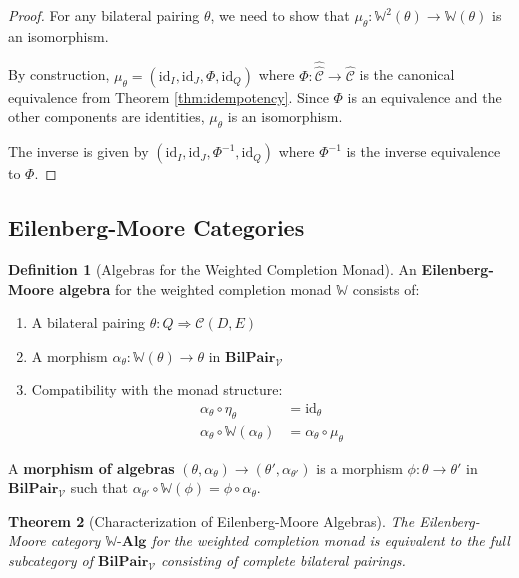 \documentclass[11pt]{article}
\theoremstyle{plain}
\newtheorem{theorem}{Theorem}[section]
\theoremstyle{definition}
\newtheorem{definition}[theorem]{Definition}
\theoremstyle{remark}
\newcommand{\V}{\mathcal{V}}
\newcommand{\C}{\mathcal{C}}
\newcommand{\id}{\mathrm{id}}
\newcommand{\wh}[1]{\widehat{#1}}
\begin{document}
\begin{proof}
For any bilateral pairing $\theta$, we need to show that $\mu_\theta : \mathbb{W}^2(\theta) \to \mathbb{W}(\theta)$ is an isomorphism.

By construction, $\mu_\theta = (\id_I, \id_J, \Phi, \id_Q)$ where $\Phi : \wh{\wh{\C}} \to \wh{\C}$ is the canonical equivalence from Theorem \ref{thm:idempotency}. Since $\Phi$ is an equivalence and the other components are identities, $\mu_\theta$ is an isomorphism.

The inverse is given by $(\id_I, \id_J, \Phi^{-1}, \id_Q)$ where $\Phi^{-1}$ is the inverse equivalence to $\Phi$.
\end{proof}

\subsection{Eilenberg-Moore Categories}

\begin{definition}[Algebras for the Weighted Completion Monad]\label{def:completion-algebras}
An \textbf{Eilenberg-Moore algebra} for the weighted completion monad $\mathbb{W}$ consists of:
\begin{enumerate}
\item A bilateral pairing $\theta : Q \Rightarrow \C(D, E)$
\item A morphism $\alpha_\theta : \mathbb{W}(\theta) \to \theta$ in $\mathbf{BilPair}_\V$
\item Compatibility with the monad structure:
\begin{align}
\alpha_\theta \circ \eta_\theta &= \id_\theta \\
\alpha_\theta \circ \mathbb{W}(\alpha_\theta) &= \alpha_\theta \circ \mu_\theta
\end{align}
\end{enumerate}

A \textbf{morphism of algebras} $(\theta, \alpha_\theta) \to (\theta', \alpha_{\theta'})$ is a morphism $\phi : \theta \to \theta'$ in $\mathbf{BilPair}_\V$ such that $\alpha_{\theta'} \circ \mathbb{W}(\phi) = \phi \circ \alpha_\theta$.
\end{definition}

\begin{theorem}[Characterization of Eilenberg-Moore Algebras]\label{thm:em-characterization}
The Eilenberg-Moore category $\mathbb{W}\text{-}\mathbf{Alg}$ for the weighted completion monad is equivalent to the full subcategory of $\mathbf{BilPair}_\V$ consisting of complete bilateral pairings.
\end{theorem}
\end{document}
